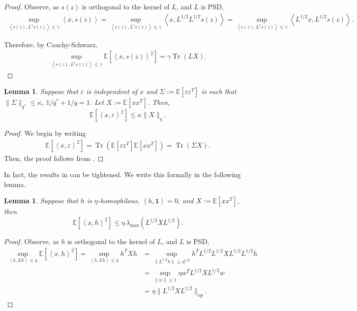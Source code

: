 \documentclass[12pt]{article}
\newtheorem{lemma}[theorem]{Lemma}
\theoremstyle{definition}
\numberwithin{equation}{section}
\numberwithin{figure}{section}
\newcommand\dotp[1]{\left\langle #1 \right\rangle}
\numberwithin{equation}{section}
\numberwithin{figure}{section}
\begin{document}
\begin{proof}
    Observe, as $s(z)$ is orthogonal to the kernel of $L$, and $L$ is PSD,
    \begin{align*}
       \sup_{\dotp{s(z), L^\dagger s(z)} \leq \gamma} \dotp{x, s(z)} = \sup_{\dotp{s(z), L^{\dagger}s(z)} \leq \gamma} \dotp{x,L^{1/2} L^{\dagger/2} s(z)} =  \sup_{\dotp{s(z), L^{\dagger}s(z)} \leq \gamma} \dotp{ L^{1/2}x, L^{\dagger/2}s(z)}.
    \end{align*}

    Therefore, by Cauchy-Schwarz, 
    \begin{align*}
       \sup_{\dotp{s(z), L^{\dagger} s(z)} \leq \gamma}  \mathbb{E}[\dotp{x, s(z)}^2] = \gamma \operatorname{Tr}(L X).
    \end{align*}
\end{proof}

\begin{lemma} \label{lemma:robustness_bd}
    Suppose that $\varepsilon$ is independent of $x$ and $\Sigma := \mathbb{E}[\varepsilon \varepsilon^T]$ is such that $\|\Sigma\|_{q^*} \leq \kappa$, $1/q^* + 1/q = 1$. Let $X:= \mathbb{E}[xx^T]$. Then,
    \[
    \mathbb{E}[\dotp{x, \varepsilon}^2] \leq \kappa \|X\|_{q}.
    \]
\end{lemma}

\begin{proof}
We begin by writing 
\begin{align*}
     \mathbb{E}[\dotp{x, \varepsilon}^2] = \operatorname{Tr}(\mathbb{E}[\varepsilon\varepsilon^T]\mathbb{E}[xx^T]) = \operatorname{Tr}(\Sigma X).
\end{align*}
Then, the proof follows from .
\end{proof}


In fact, the results in  can be tightened. We write this formally in the following lemma.
\begin{lemma}
 \label{lemma:tighter_homophily_bd}
    Suppose that $h$ is $\eta$-homophilous, $\dotp{h, \mathbf{1}} = 0$, and $X:= \mathbb{E}[xx^T]$, then
    \[
    \mathbb{E}[\dotp{x, h}^2] \leq \eta \, \lambda_{\max}(L^{\dagger/2}XL^{\dagger/2}).
    \]   
\end{lemma}

\begin{proof}
    Observe, as $h$ is orthogonal to the kernel of $L$, and $L$ is PSD,
    \begin{align*}
       \sup_{\dotp{h, Lh} \leq \eta} \mathbb{E}[\dotp{x, h}^2] =  \sup_{\dotp{h, Lh} \leq \eta} h^T X h &= \sup_{\| L^{1/2} h\| \leq \eta^{1/2}} h^T L^{1/2} L^{\dagger/2 } X L^{\dagger/2} L^{1/2} h \\
       &= \sup_{\| w\| \leq 1}  \eta w^T L^{\dagger/2 } X L^{\dagger/2} w \\
       &=  \eta \| L^{\dagger/2 } X L^{\dagger/2} \|_{\operatorname{op}}.
    \end{align*}
\end{proof}
\end{document}
